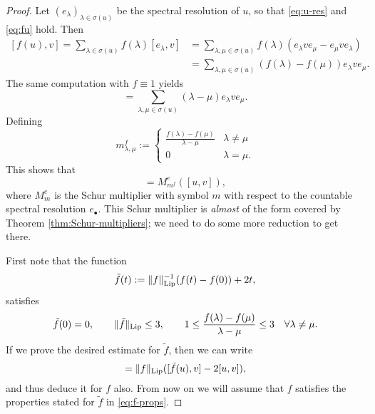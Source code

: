 \begin{proof}
  Let $(e_{\lambda})_{\lambda \in \sigma(u)}$ be the spectral resolution of $u$, so that \eqref{eq:u-res} and \eqref{eq:fu} hold.
  Then
  \begin{equation*}
    \begin{aligned}
      [f(u),v]
      = \sum_{\lambda \in \sigma(u)} f(\lambda) [  e_{\lambda},  v ] 
      &= \sum_{\lambda, \mu \in \sigma(u)} f(\lambda) (e_{\lambda} v e_{\mu} - e_{\mu} v e_{\lambda}) \\
      &= \sum_{\lambda, \mu \in \sigma(u)} (f(\lambda) - f(\mu)) e_{\lambda} v e_{\mu}.
    \end{aligned}
  \end{equation*}
  The same computation with $f \equiv 1$ yields
  \begin{equation*}
    [u,v] = \sum_{\lambda, \mu \in \sigma(u)} (\lambda - \mu) e_{\lambda} v e_{\mu}.
  \end{equation*}
  Defining
  \begin{equation*}
    m_{\lambda,\mu}^{f} :=
    \begin{cases}
      \frac{f(\lambda) - f(\mu)}{\lambda - \mu} & \lambda \neq \mu \\
      0 & \lambda = \mu.
    \end{cases}
  \end{equation*}
  This shows that
  \begin{equation*}
    [f(u),v] = M^{e}_{m^{f}}([u,v]),
  \end{equation*}
  where $M^{e}_{m}$ is the Schur multiplier with symbol $m$ with respect to the countable spectral resolution $e_{\bullet}$.
  This Schur multiplier is \emph{almost} of the form covered by Theorem \ref{thm:Schur-multipliers}; we need to do some more reduction to get there.
  
  First note that the function
  \begin{equation*}
    \tilde{f}(t) := \|f\|_{\mathrm{Lip}}^{-1} (f(t) - f(0)) + 2t,
  \end{equation*}
  satisfies
  \begin{equation}\label{eq:f-props}
    \tilde{f}(0) = 0, \qquad  \|\tilde{f}\|_{\mathrm{Lip}} \leq 3, \qquad 1 \leq \frac{f(\lambda) - f(\mu)}{\lambda - \mu} \leq 3 \quad  \forall \lambda \neq \mu.
  \end{equation}
  If we prove the desired estimate for $\tilde{f}$, then we can write
  \begin{equation*}
    [f(u),v] = \|f\|_{\Lip}([\tilde{f}(u),v] - 2[u,v]), 
  \end{equation*}
  and thus deduce it for $f$ also.
  From now on we will assume that $f$ satisfies the properties stated for $\tilde{f}$ in \eqref{eq:f-props}.


\end{proof}
